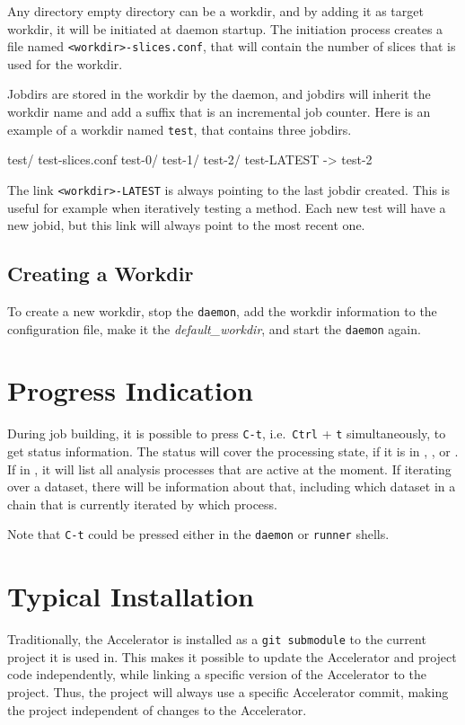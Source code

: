 Any directory empty directory can be a workdir, and by adding it as
target workdir, it will be initiated at daemon startup.  The
initiation process creates a file named
\texttt{<workdir>-slices.conf}, that will contain the number
of slices that is used for the workdir.

Jobdirs are stored in the workdir by the daemon, and jobdirs will
inherit the workdir name and add a suffix that is an incremental job
counter.  Here is an example of a workdir named \texttt{test}, that
contains three jobdirs.
\begin{shell}
test/
    test-slices.conf
    test-0/
    test-1/
    test-2/
    test-LATEST -> test-2
\end{shell}
The link \texttt{<workdir>-LATEST} is always pointing to the last
jobdir created.  This is useful for example when iteratively testing a
method.  Each new test will have a new jobid, but this link will
always point to the most recent one.


\subsection{Creating a Workdir}
To create a new workdir, stop the \texttt{daemon}, add the workdir
information to the configuration file, make it
the \textsl{default\_workdir}, and start the \texttt{daemon} again.



\clearpage

\section{Progress Indication}

During job building, it is possible to press \texttt{C-t},
i.e.\ \texttt{Ctrl} + \texttt{t} simultaneously, to get status
information.  The status will cover the processing state, if it is
in \prepare, \analysis, or \synthesis.  If in \analysis, it will list
all analysis processes that are active at the moment.  If iterating
over a dataset, there will be information about that, including which
dataset in a chain that is currently iterated by which \analysis
process.

Note that \texttt{C-t} could be pressed either in the \texttt{daemon}
or \texttt{runner} shells.



\clearpage

\section{Typical Installation}
Traditionally, the Accelerator is installed as a \texttt{git
submodule} to the current project it is used in.  This makes it
possible to update the Accelerator and project code independently,
while linking a specific version of the Accelerator to the project.
Thus, the project will always use a specific Accelerator commit,
making the project independent of changes to the Accelerator.

